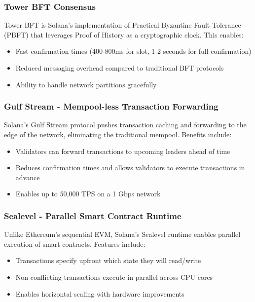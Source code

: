 \documentclass[a4paper,13pt,twoside]{report}
\theoremstyle{definition}
\begin{document}
\subsubsection{Tower BFT Consensus}

Tower BFT is Solana's implementation of Practical Byzantine Fault Tolerance (PBFT) that leverages Proof of History as a cryptographic clock. This enables:

\begin{itemize}
    \item Fast confirmation times (400-800ms for slot, 1-2 seconds for full confirmation)
    \item Reduced messaging overhead compared to traditional BFT protocols
    \item Ability to handle network partitions gracefully
\end{itemize}

\subsubsection{Gulf Stream - Mempool-less Transaction Forwarding}

Solana's Gulf Stream protocol pushes transaction caching and forwarding to the edge of the network, eliminating the traditional mempool. Benefits include:

\begin{itemize}
    \item Validators can forward transactions to upcoming leaders ahead of time
    \item Reduces confirmation times and allows validators to execute transactions in advance
    \item Enables up to 50,000 TPS on a 1 Gbps network
\end{itemize}

\subsubsection{Sealevel - Parallel Smart Contract Runtime}

Unlike Ethereum's sequential EVM, Solana's Sealevel runtime enables parallel execution of smart contracts. Features include:

\begin{itemize}
    \item Transactions specify upfront which state they will read/write
    \item Non-conflicting transactions execute in parallel across CPU cores
    \item Enables horizontal scaling with hardware improvements
\end{itemize}
\end{document}
